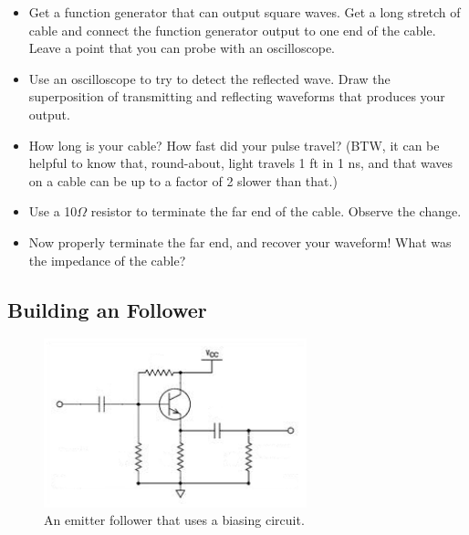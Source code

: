 \documentclass[11pt]{article}
\begin{document}
\begin{itemize}
\item Get a function generator that can output square waves.
Get a long stretch of cable and connect the function generator output to one
end of the cable.  Leave a point that you can probe with an oscilloscope.
\item Use an oscilloscope to try to detect the reflected wave.  Draw the superposition of 
transmitting and reflecting waveforms that produces your output.
\item How long is your cable?  How fast did your
pulse travel?  (BTW, it can be helpful to know that, round-about, light travels 1 ft in 1 ns, and that
waves on a cable can be up to a factor of 2 slower than that.)
\item Use a 10$\Omega$ resistor to terminate the far end of the cable.  Observe the change.
\item Now properly terminate the far end, and recover your waveform!  What was the impedance of the cable?
\end{itemize}

\subsection{Building an Follower}

\begin{figure}[h!]\centering
\includegraphics[width=3in]{plots/biased_emitter_follower.png}
\caption{An emitter follower that uses a biasing circuit.}
\label{fig:emitter_follower}
\end{figure}
\end{document}
